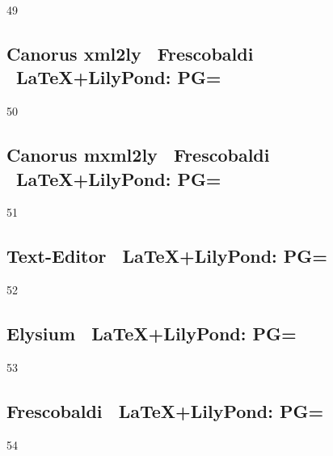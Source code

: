 49

\subsection{Canorus \ra xml2ly \ra\ Frescobaldi \ra\ \LaTeX+LilyPond: PG=}

50

\subsection{Canorus \ra mxml2ly \ra\ Frescobaldi \ra\ \LaTeX+LilyPond: PG=}

51

\subsection{Text-Editor \ra\ \LaTeX+LilyPond: PG=}

52

\subsection{Elysium \ra\ \LaTeX+LilyPond: PG=}

53
\subsection{Frescobaldi \ra\ \LaTeX+LilyPond: PG=}

54




